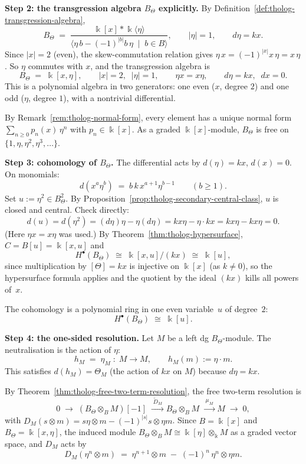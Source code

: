 \begin{example}
\medskip
\noindent\textbf{Step 2: the transgression algebra $B_\Theta$ explicitly.}
By Definition~\ref{def:tholog-transgression-algebra},
\[
B_\Theta
\;=\;
\frac{\Bbbk[x]*\Bbbk\langle\eta\rangle}
{\langle\eta\,b-(-1)^{|b|}b\,\eta\;\mid\;b\in B\rangle},
\qquad |\eta|=1,\qquad d\eta=kx.
\]
Since $|x|=2$ (even), the skew-commutation relation gives
$\eta\,x=(-1)^{|x|}x\,\eta = x\,\eta$.
So $\eta$ commutes with $x$, and the transgression algebra is
\[
B_\Theta \;=\; \Bbbk[x,\eta],
\qquad |x|=2,\;\;|\eta|=1,\qquad
\eta x=x\eta,\qquad
d\eta=kx,\;\;dx=0.
\]
This is a polynomial algebra in two generators: one even ($x$, degree $2$)
and one odd ($\eta$, degree $1$), with a nontrivial differential.

By Remark~\ref{rem:tholog-normal-form}, every element has a unique
normal form $\sum_{n\geq 0} p_n(x)\,\eta^n$ with $p_n\in\Bbbk[x]$.
As a graded $\Bbbk[x]$-module, $B_\Theta$ is free on
$\{1,\eta,\eta^2,\eta^3,\dots\}$.

\medskip
\noindent\textbf{Step 3: cohomology of $B_\Theta$.}
The differential acts by $d(\eta)=kx$, $d(x)=0$. On monomials:
\[
d(x^a\eta^b) \;=\; b\,k\,x^{a+1}\eta^{b-1}
\qquad (b\geq 1).
\]
Set $u:=\eta^2\in B_\Theta^2$. By
Proposition~\ref{prop:tholog-secondary-central-class},
$u$ is closed and central. Check directly:
\[
d(u)=d(\eta^2)=(d\eta)\eta-\eta(d\eta)
= kx\eta-\eta\cdot kx=kx\eta-kx\eta=0.
\]
(Here $\eta x=x\eta$ was used.) By
Theorem~\ref{thm:tholog-hypersurface}, $C=B[u]=\Bbbk[x,u]$
and
\[
H^\bullet(B_\Theta) \;\cong\; \Bbbk[x,u]/(kx) \;\cong\; \Bbbk[u],
\]
since multiplication by $[\Theta]=kx$ is injective on $\Bbbk[x]$ (as
$k\neq 0$), so the hypersurface formula applies and the quotient
by the ideal $(kx)$ kills all powers of~$x$.

The cohomology is a polynomial ring in one even variable~$u$ of
degree~$2$:
\[
H^\bullet(B_\Theta) \;\cong\; \Bbbk[u].
\]

\medskip
\noindent\textbf{Step 4: the one-sided resolution.}
Let $M$ be a left dg $B_\Theta$-module. The neutralisation is the
action of $\eta$:
\[
h_M \;=\; \eta_M \;:\; M\to M,\qquad h_M(m):=\eta\cdot m.
\]
This satisfies $d(h_M)=\Theta_M$ (the action of $kx$ on $M$)
because $d\eta=kx$.

By Theorem~\ref{thm:tholog-free-two-term-resolution}, the free
two-term resolution is
\[
0 \;\longrightarrow\;
(B_\Theta\otimes_B M)[-1]
\;\xrightarrow{\;\widetilde D_M\;}
B_\Theta\otimes_B M
\;\xrightarrow{\;\mu_M\;}
M
\;\longrightarrow\; 0,
\]
with $D_M(s\otimes m)=s\eta\otimes m - (-1)^{|s|}s\otimes\eta m$.
Since $B=\Bbbk[x]$ and $B_\Theta=\Bbbk[x,\eta]$, the induced
module $B_\Theta\otimes_B M\cong\Bbbk[\eta]\otimes_\Bbbk M$
as a graded vector space, and $D_M$ acts by
\[
D_M(\eta^n\otimes m) \;=\; \eta^{n+1}\otimes m
\;-\; (-1)^n\,\eta^n\otimes\eta m.
\]


\end{example}
